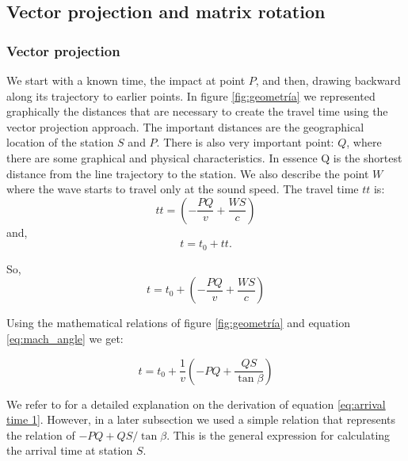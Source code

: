 \documentclass[linenum]{SSA-SRL}
\begin{document}
\subsection{Vector projection and matrix rotation
}
\subsubsection{Vector projection}
We start with a known time, the impact at point \( P \),  and then, drawing backward along its trajectory to earlier points. In figure \ref{fig:geometría} we represented graphically the distances that are necessary to create the travel time using the vector projection approach. The important distances are the geographical location of the station $S$ and  $P$. There is also very important point: $Q$, where there are some graphical and physical characteristics. In essence Q  is the shortest distance from the line trajectory to the station. We also describe the point $W$ where the wave starts to travel only at the sound speed.  The travel time \(tt\) is:
\begin{equation}
tt =  \left( -\frac{PQ}{v}  + \frac{WS}{c} \right)
\label{eq:tt}
\end{equation}
and,
\begin{equation}
t= t_0 + tt.
\label{eq:t01}
\end{equation}

So, 
\begin{equation}
t = t_0 + \left( -\frac{PQ}{v}  + \frac{WS}{c} \right)
\label{eq:arrival time 1}
\end{equation}

Using the mathematical relations of figure \ref{fig:geometría}  and equation \ref{eq:mach_angle} we get:

\begin{equation}
t = t_0 + \frac{1}{v} \left(- PQ + \frac{QS}{\tan\beta} \right)
\label{eq:arrival time 1}
\end{equation}

We refer to \citep{Pujol_2005} for a detailed explanation on the derivation of equation \ref{eq:arrival time 1}. However, in a later subsection we used a simple relation that represents the relation of $-PQ + {QS}/{\tan\beta}$. This is the general expression for calculating the arrival time at station \( S \). 
\end{document}
